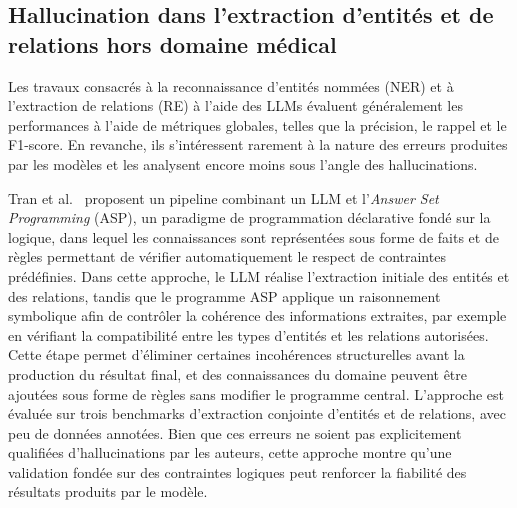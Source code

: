 \subsection{Hallucination dans l'extraction d'entités et de relations hors domaine médical}

Les travaux consacrés à la reconnaissance d'entités nommées (NER) et à l'extraction de relations (RE) à l'aide des LLMs évaluent généralement les performances à l'aide de métriques globales, telles que la précision, le rappel et le F1-score. En revanche, ils s'intéressent rarement à la nature des erreurs produites par les modèles et les analysent encore moins sous l'angle des hallucinations.

Tran et al.~\cite{tran2025aspworkflow} proposent un pipeline combinant un LLM et l'\textit{Answer Set Programming} (ASP), un paradigme de programmation déclarative fondé sur la logique, dans lequel les connaissances sont représentées sous forme de faits et de règles permettant de vérifier automatiquement le respect de contraintes prédéfinies. Dans cette approche, le LLM réalise l'extraction initiale des entités et des relations, tandis que le programme ASP applique un raisonnement symbolique afin de contrôler la cohérence des informations extraites, par exemple en vérifiant la compatibilité entre les types d'entités et les relations autorisées. Cette étape permet d'éliminer certaines incohérences structurelles avant la production du résultat final, et des connaissances du domaine peuvent être ajoutées sous forme de règles sans modifier le programme central. L'approche est évaluée sur trois benchmarks d'extraction conjointe d'entités et de relations, avec peu de données annotées. Bien que ces erreurs ne soient pas explicitement qualifiées d'hallucinations par les auteurs, cette approche montre qu'une validation fondée sur des contraintes logiques peut renforcer la fiabilité des résultats produits par le modèle.

